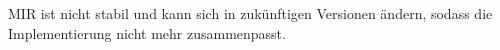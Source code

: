 \documentclass[paper=a4,%
  twoside,%
  BCOR4mm,%
  abstract=true,%
  toc=bibliography,%
  chapterprefix=true,%
  toc=bibliographynumbered,%
  open=right,%
  english,%
  pagesize=pdftex]{scrreprt}
\begin{document}
MIR ist nicht stabil und kann sich in zukünftigen Versionen ändern, sodass die Implementierung nicht mehr zusammenpasst.

\end{document}
